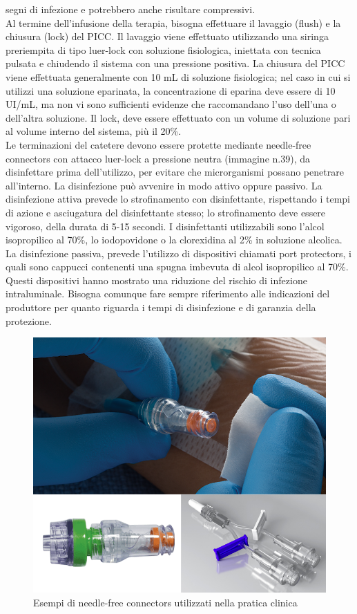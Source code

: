segni di infezione e potrebbero anche risultare compressivi\cite{AIOMCVC}.\\
Al termine dell’infusione della terapia, bisogna effettuare il lavaggio (flush) e la chiusura (lock) del PICC.
Il lavaggio viene effettuato utilizzando una siringa preriempita di tipo luer-lock con soluzione fisiologica, 
iniettata con tecnica pulsata e chiudendo il sistema con una pressione positiva. La chiusura del PICC viene effettuata 
generalmente con 10 mL di soluzione fisiologica; nel caso in cui si utilizzi una soluzione eparinata, la 
concentrazione di eparina deve essere di 10 UI/mL, ma non vi sono sufficienti evidenze che raccomandano l’uso 
dell’una o dell’altra soluzione. 
Il lock, deve essere effettuato con un volume di soluzione pari al volume interno del sistema, più il 20\%.\\
Le terminazioni del catetere devono essere protette mediante needle-free connectors con attacco luer-lock a pressione 
neutra (immagine n.39), da disinfettare prima dell’utilizzo, per evitare che microrganismi possano penetrare 
all’interno. La disinfezione può avvenire in modo attivo oppure passivo. La disinfezione attiva prevede lo 
strofinamento con disinfettante, rispettando i tempi di azione e asciugatura del disinfettante stesso; 
lo strofinamento deve essere vigoroso, della durata di 5-15 secondi. I disinfettanti utilizzabili sono 
l’alcol isopropilico al 70\%, lo iodopovidone o la clorexidina al 2\% in soluzione alcolica\cite{AIOMCVC}.\\
La disinfezione passiva, prevede l’utilizzo di dispositivi chiamati port protectors, i quali sono cappucci contenenti 
una spugna imbevuta di alcol isopropilico al 70\%. Questi dispositivi hanno mostrato una riduzione del rischio di 
infezione intraluminale. Bisogna comunque fare sempre riferimento alle indicazioni del produttore per quanto 
riguarda i tempi di disinfezione e di garanzia della protezione\cite{AIOMCVC}.\\

\begin{figure}[H]
    \begin{center}
    \includegraphics[width=0.5\columnwidth]{img/needlefree.png}
    \end{center}
    \caption[Esempi di needle-free connectors utilizzati nella pratica clinica]{Esempi di needle-free connectors utilizzati nella pratica clinica
    \cite{img46}}

\end{figure}

